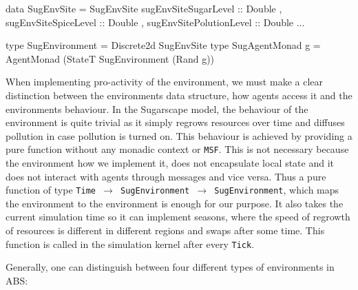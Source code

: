 \begin{HaskellCode}
data SugEnvSite = SugEnvSite 
  { sugEnvSiteSugarLevel    :: Double
  , sugEnvSiteSpiceLevel    :: Double
  , sugEnvSitePolutionLevel :: Double
  ...
  }

type SugEnvironment  = Discrete2d SugEnvSite
type SugAgentMonad g = AgentMonad (StateT SugEnvironment (Rand g))
\end{HaskellCode}

When implementing pro-activity of the environment, we must make a clear distinction between the environments data structure, how agents access it and the environments behaviour. In the Sugarscape model, the behaviour of the environment is quite trivial as it simply regrows resources over time and diffuses pollution in case pollution is turned on. This behaviour is achieved by providing a pure function without any monadic context or \texttt{MSF}. This is not necessary because the environment how we implement it, does not encapsulate local state and it does not interact with agents through messages and vice versa. Thus a pure function of type \texttt{Time $\rightarrow$ SugEnvironment $\rightarrow$ SugEnvironment}, which maps the environment to the environment is enough for our purpose. It also takes the current simulation time so it can implement seasons, where the speed of regrowth of resources is different in different regions and swaps after some time. This function is called in the simulation kernel after every \texttt{Tick}.

\medskip

Generally, one can distinguish between four different types of environments in ABS:

